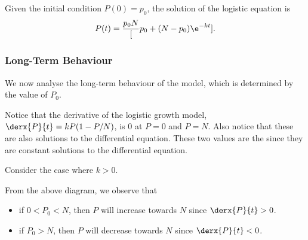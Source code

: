 Given the initial condition $P(0) = p_0$, the solution of the logistic equation is \[P(t) = \frac{p_0 N}[p_0 + (N-p_0) \e^{-kt}].\]

\subsubsection{Long-Term Behaviour}

We now analyse the long-term behaviour of the model, which is determined by the value of $P_0$.

Notice that the derivative of the logistic growth model, $\derx{P}{t} = kP(1 - P/N)$, is 0 at $P = 0$ and $P = N$. Also notice that these are also solutions to the differential equation. These two values are the  since they are constant solutions to the differential equation.

Consider the case where $k > 0$.

\begin{figure}[H]
    \centering
    \caption{}
\end{figure}

From the above diagram, we observe that
\begin{itemize}
    \item if $0 < P_0 < N$, then $P$ will increase towards $N$ since $\derx{P}{t} > 0$.
    \item if $P_0 > N$, then $P$ will decrease towards $N$ since $\derx{P}{t} < 0$.
\end{itemize}


